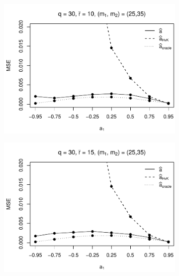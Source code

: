 \begin{figure}[p]
\begin{subfigure}[b]{0.45\textwidth}
\includegraphics[width=\textwidth]{Plots/Robustness/MSE_a1_zoomed_T=500_slope=10_(q,K1,K2,M1,M2)=(30,2,10,25,35).pdf}
\end{subfigure}
\hspace{0.25cm}
\begin{subfigure}[b]{0.45\textwidth}
\includegraphics[width=\textwidth]{Plots/Robustness/MSE_a1_zoomed_T=500_slope=10_(q,K1,K2,M1,M2)=(30,2,15,25,35).pdf}
\end{subfigure}


\end{figure}
